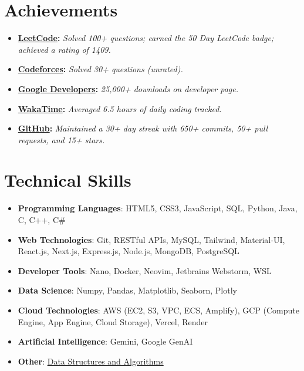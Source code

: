 \documentclass[letterpaper,11pt]{article}
\newcommand{\resumeItem}[1]{
  \item\small{ %
    {#1 \vspace{-2pt}}
  }
}
\newcommand{\resumeSubHeadingListStart}{\begin{itemize}[leftmargin=0.15in, label={}]}
\newcommand{\resumeSubHeadingListEnd}{\end{itemize}}
\begin{document}
\section{Achievements}
    \resumeSubHeadingListStart
        \resumeItem{\textbf{\href{https://leetcode.com/u/abhay-byte/}{LeetCode}:} \textit{Solved 100+ questions; earned the 50 Day LeetCode badge; achieved a rating of 1409.}}
        \resumeItem{\textbf{\href{https://codeforces.com/profile/abhay.byte02}{Codeforces}:} \textit{Solved 30+ questions (unrated).}}
        \resumeItem{\textbf{\href{https://play.google.com/store/apps/dev?id=8004929841101888920&hl=en_US&gl=US}{Google Developers}:} \textit{25,000+ downloads on developer page.}}
        \resumeItem{\textbf{\href{https://wakatime.com/@abhay_byte}{WakaTime}:} \textit{Averaged 6.5 hours of daily coding tracked.}}
        \resumeItem{\textbf{\href{https://github.com/abhay-byte/}{GitHub}:} \textit{Maintained a 30+ day streak with 650+ commits, 50+ pull requests, and 15+ stars.}}
    \resumeSubHeadingListEnd

\section{Technical Skills}
  \resumeSubHeadingListStart %
    \resumeItem {\textbf{Programming Languages}{: HTML5, CSS3, JavaScript, SQL, Python, Java, C, C++, C\#}} \\ %
    \resumeItem {\textbf{Web Technologies}{: Git, RESTful APIs, MySQL, Tailwind, Material-UI, React.js, Next.js, Express.js, Node.js, MongoDB, PostgreSQL}} \\ %
    \resumeItem {\textbf{Developer Tools}{: Nano, Docker, Neovim, Jetbrains Webstorm, WSL} }\\ %
    \resumeItem {\textbf{Data Science}{: Numpy, Pandas, Matplotlib, Seaborn, Plotly}} \\ %
    \resumeItem {\textbf{Cloud Technologies}{: AWS (EC2, S3, VPC, ECS, Amplify), GCP (Compute Engine, App Engine, Cloud Storage), Vercel, Render} }\\ %
    \resumeItem {\textbf{Artificial Intelligence}{: Gemini, Google GenAI}} \\ %
    \resumeItem {\textbf{Other}{: \href{https://github.com/abhay-byte/DSA_Practice}{Data Structures and Algorithms}}}
\end{itemize}

\end{document}
